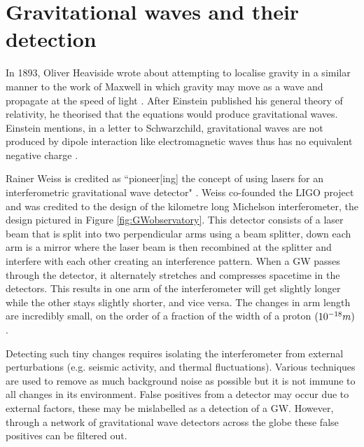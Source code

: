 \section{Gravitational waves and their detection}

In 1893, Oliver Heaviside wrote about attempting to localise gravity in a similar manner to the work of Maxwell in which gravity may move as a wave and propagate at the speed of light \cite{Heaside1894}. After Einstein published his general theory of relativity, he theorised that the equations would produce gravitational waves. Einstein mentions, in a letter to Schwarzchild, gravitational waves are not produced by dipole interaction like electromagnetic waves thus has no equivalent negative charge \cite{universe2030022}. 

Rainer Weiss is credited as ``pioneer[ing] the concept of using lasers for an interferometric gravitational wave detector" \cite{noauthor_rainer_2024}. Weiss co-founded the LIGO project and was credited to the design of the kilometre long Michelson interferometer, the design pictured in Figure \ref{fig:GWobservatory}. This detector consists of a laser beam that is split into two perpendicular arms using a beam splitter, down each arm is a mirror where the laser beam is then recombined at the splitter and interfere with each other creating an interference pattern. When a GW passes through the detector, it alternately stretches and compresses spacetime in the detectors. This results in one arm of the interferometer will get slightly longer while the other stays slightly shorter, and vice versa. The changes in arm length are incredibly small, on the order of a fraction of the width of a proton $(10^{-18}\space m)$.

Detecting such tiny changes requires isolating the interferometer from external perturbations (e.g. seismic activity, and thermal fluctuations). Various techniques are used to remove as much background noise as possible but it is not immune to all changes in its environment. False positives from a detector may occur due to external factors, these may be mislabelled as a detection of a GW. However, through a network of gravitational wave detectors across the globe these false positives can be filtered out.

